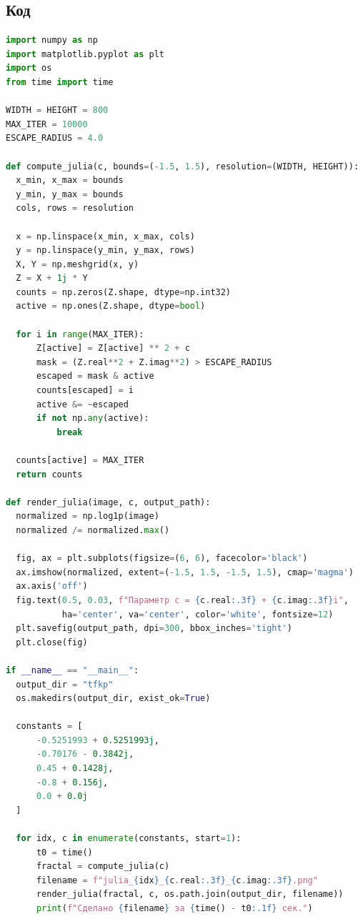 \begin{section_3}
\subsection{Код}
\begin{lstlisting}[language=Python]
import numpy as np
import matplotlib.pyplot as plt
import os
from time import time

WIDTH = HEIGHT = 800
MAX_ITER = 10000
ESCAPE_RADIUS = 4.0

def compute_julia(c, bounds=(-1.5, 1.5), resolution=(WIDTH, HEIGHT)):
  x_min, x_max = bounds
  y_min, y_max = bounds
  cols, rows = resolution

  x = np.linspace(x_min, x_max, cols)
  y = np.linspace(y_min, y_max, rows)
  X, Y = np.meshgrid(x, y)
  Z = X + 1j * Y
  counts = np.zeros(Z.shape, dtype=np.int32)
  active = np.ones(Z.shape, dtype=bool)

  for i in range(MAX_ITER):
      Z[active] = Z[active] ** 2 + c
      mask = (Z.real**2 + Z.imag**2) > ESCAPE_RADIUS
      escaped = mask & active
      counts[escaped] = i
      active &= ~escaped
      if not np.any(active):
          break

  counts[active] = MAX_ITER
  return counts

def render_julia(image, c, output_path):
  normalized = np.log1p(image)
  normalized /= normalized.max()

  fig, ax = plt.subplots(figsize=(6, 6), facecolor='black')
  ax.imshow(normalized, extent=(-1.5, 1.5, -1.5, 1.5), cmap='magma')
  ax.axis('off')
  fig.text(0.5, 0.03, f"Параметр c = {c.real:.3f} + {c.imag:.3f}i",
           ha='center', va='center', color='white', fontsize=12)
  plt.savefig(output_path, dpi=300, bbox_inches='tight')
  plt.close(fig)

if __name__ == "__main__":
  output_dir = "tfkp"
  os.makedirs(output_dir, exist_ok=True)

  constants = [
      -0.5251993 + 0.5251993j,
      -0.70176 - 0.3842j,
      0.45 + 0.1428j,
      -0.8 + 0.156j,
      0.0 + 0.0j
  ]

  for idx, c in enumerate(constants, start=1):
      t0 = time()
      fractal = compute_julia(c)
      filename = f"julia_{idx}_{c.real:.3f}_{c.imag:.3f}.png"
      render_julia(fractal, c, os.path.join(output_dir, filename))
      print(f"Сделано {filename} за {time() - t0:.1f} cек.")

\end{lstlisting}

\end{section_3}
